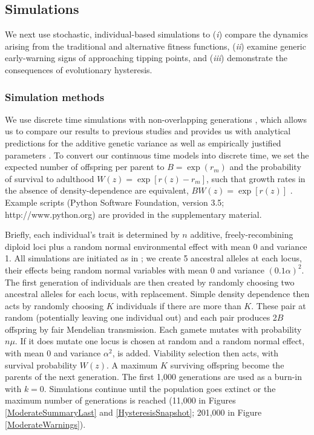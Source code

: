 \documentclass[12pt,letterpaper]{article} %
\begin{document}
\subsection*{Simulations}

We next use stochastic, individual-based simulations to (\textit{i}) compare the dynamics arising from the traditional and alternative fitness functions, (\textit{ii}) examine generic early-warning signs of approaching tipping points, and (\textit{iii}) demonstrate the consequences of evolutionary hysteresis.

\subsubsection*{Simulation methods}

We use discrete time simulations with non-overlapping generations \citep[as described in][]{Burger1995}, which allows us to compare our results to previous studies and provides us with analytical predictions for the additive genetic variance \citep[equations 14 and 15 in][]{Burger1995} as well as empirically justified parameters \citep{Burger1995}.
To convert our continuous time models into discrete time, we set the expected number of offspring per parent to $B=\exp(r_m)$ and the probability of survival to adulthood $W(z)=\exp[r(z)-r_m]$, such that growth rates in the absence of density-dependence are equivalent, $BW(z)=\exp[r(z)]$ \citep[][Chapter 1]{Crow1970}.
Example scripts (Python Software Foundation, version 3.5; http://www.python.org) are provided in the supplementary material.

Briefly, each individual's trait is determined by $n$ additive, freely-recombining diploid loci plus a random normal environmental effect with mean 0 and variance 1.
All simulations are initiated as in \cite{Burger1995}; we create 5 ancestral alleles at each locus, their effects being random normal variables with mean 0 and variance $(0.1\alpha)^2$. 
The first generation of individuals are then created by randomly choosing two ancestral alleles for each locus, with replacement.
Simple density dependence then acts by randomly choosing $K$ individuals if there are more than $K$.
These pair at random (potentially leaving one individual out) and each pair produces 2$B$ offspring by fair Mendelian transmission.
Each gamete mutates with probability $n \mu$.
If it does mutate one locus is chosen at random and a random normal effect, with mean 0 and variance $\alpha^2$, is added.
Viability selection then acts, with survival probability $W(z)$.
A maximum $K$ surviving offspring become the parents of the next generation.
The first 1,000 generations are used as a burn-in with $k=0$.
Simulations continue until the population goes extinct or the maximum number of generations is reached (11,000 in Figures \ref{ModerateSummaryLast} and \ref{HysteresisSnapshot}; 201,000 in Figure \ref{ModerateWarnings}).
\end{document}
